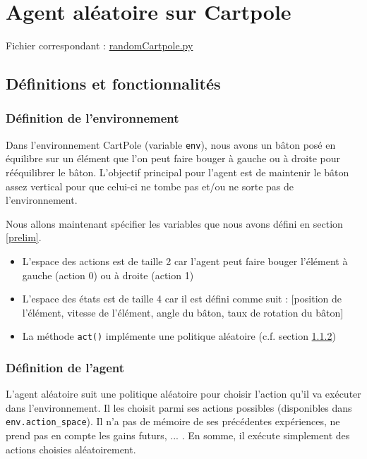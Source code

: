 \documentclass[10pt,a4paper]{article}
\begin{document}
\section{Agent aléatoire sur Cartpole}

Fichier correspondant : \href{https://github.com/NellyBarret/IA5-TP-APR/blob/master/randomCartPole.py}{randomCartpole.py}

\subsection{Définitions et fonctionnalités}

\subsubsection{Définition de l'environnement}

Dans l'environnement CartPole (variable \lstinline{env}), nous avons un bâton posé en équilibre sur un élément que l'on peut faire bouger à gauche ou à droite pour rééquilibrer le bâton. L'objectif principal pour l'agent est de maintenir le bâton assez vertical pour que celui-ci ne tombe pas et/ou ne sorte pas de l'environnement.

Nous allons maintenant spécifier les variables que nous avons défini en section \ref{prelim}.
\begin{itemize}
	\item L'espace des actions est de taille 2 car l'agent peut faire bouger l'élément à gauche (action 0) ou à droite (action 1)
	\item L'espace des états est de taille 4 car il est défini comme suit : [position de l'élément, vitesse de l'élément, angle du bâton, taux de rotation du bâton]
	\item La méthode \lstinline{act()} implémente une politique aléatoire (c.f. section \ref{defAgentRand})
\end{itemize}

\subsubsection{Définition de l'agent} \label{defAgentRand}

L'agent aléatoire suit une politique aléatoire pour choisir l'action qu'il va exécuter dans l'environnement. Il les choisit parmi ses actions possibles (disponibles dans \lstinline{env.action_space}). Il n'a pas de mémoire de ses précédentes expériences, ne prend pas en compte les gains futurs, ... . En somme, il exécute simplement des actions choisies aléatoirement.
\end{document}
